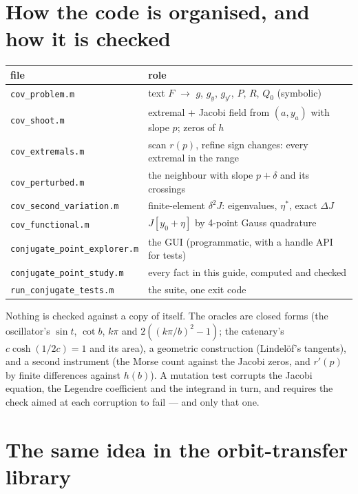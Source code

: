 \documentclass[11pt]{article}
\newcommand{\file}[1]{\texttt{#1}}
\begin{document}
\section{How the code is organised, and how it is checked}

\begin{center}\small
\begin{tabular}{@{}ll@{}}
\toprule
file & role \\
\midrule
\file{cov\_problem.m} & text $F$ $\to$ $g$, $g_y$, $g_{y'}$, $P$, $R$, $Q_0$ (symbolic) \\
\file{cov\_shoot.m} & extremal + Jacobi field from $(a, y_a)$ with slope $p$; zeros of $h$ \\
\file{cov\_extremals.m} & scan $r(p)$, refine sign changes: every extremal in the range \\
\file{cov\_perturbed.m} & the neighbour with slope $p + \delta$ and its crossings \\
\file{cov\_second\_variation.m} & finite-element $\delta^2 J$: eigenvalues, $\eta^*$, exact $\Delta J$ \\
\file{cov\_functional.m} & $J[y_0 + \eta]$ by 4-point Gauss quadrature \\
\file{conjugate\_point\_explorer.m} & the GUI (programmatic, with a handle API for tests) \\
\file{conjugate\_point\_study.m} & every fact in this guide, computed and checked \\
\file{run\_conjugate\_tests.m} & the suite, one exit code \\
\bottomrule
\end{tabular}
\end{center}

Nothing is checked against a copy of itself. The oracles are closed forms (the
oscillator's $\sin t$, $\cot b$, $k\pi$ and $2((k\pi/b)^2 - 1)$; the catenary's
$c\cosh(1/2c) = 1$ and its area), a geometric construction (Lindel\"of's
tangents), and a second instrument (the Morse count against the Jacobi zeros,
and $r'(p)$ by finite differences against $h(b)$). A mutation test corrupts the
Jacobi equation, the Legendre coefficient and the integrand in turn, and requires
the check aimed at each corruption to fail --- and only that one.

\section{The same idea in the orbit-transfer library}
\end{document}
